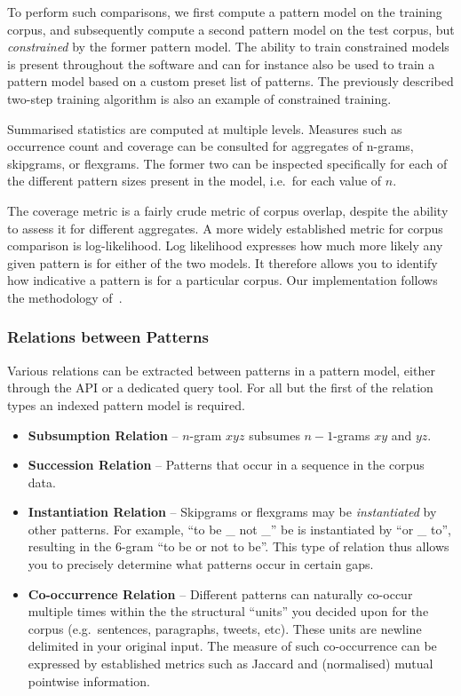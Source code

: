 \documentclass[a4paper,12pt]{article}
\begin{document}
To perform such comparisons, we first compute a pattern model on the training
corpus, and subsequently compute a second pattern model on the test corpus, but
\emph{constrained} by the former pattern model. The ability to train
constrained models is present throughout the software and can for instance also
be used to train a pattern model based on a custom preset list of patterns. The
previously described two-step training algorithm is also an example of
constrained training.

Summarised statistics are computed at multiple levels. Measures such as
occurrence count and coverage can be consulted for aggregates of n-grams,
skipgrams, or flexgrams. The former two can be inspected specifically for each
of the different pattern sizes present in the model, i.e.\ for each value of $n$.

The coverage metric is a fairly crude metric of corpus overlap, despite the
ability to assess it for different aggregates. A more widely established metric
for corpus comparison is log-likelihood. Log likelihood expresses how much more
likely any given pattern is for either of the two models. It therefore allows
you to identify how indicative a pattern is for a particular corpus. Our
implementation follows the methodology of~\cite{Rayson00comparingcorpora}.

\subsubsection{Relations between Patterns}

Various relations can be extracted between patterns in a pattern model, either
through the API or a dedicated query tool. For all but the first of the
relation types an indexed pattern model is required. 

\begin{itemize}
 \item \textbf{Subsumption Relation} -- $n$-gram $x y z$ subsumes $n-1$-grams $x y$ and $y z$. 
 \item \textbf{Succession Relation} -- Patterns that occur in a sequence in the corpus data. 
 \item \textbf{Instantiation Relation} -- Skipgrams or flexgrams may be
     \emph{instantiated} by other patterns. For example, ``to be \_ not \_'' be
     is instantiated by ``or \_ to'', resulting in the 6-gram ``to be or not to be''. This type of relation thus allows you to precisely determine what patterns occur in certain gaps.
 \item \textbf{Co-occurrence Relation} -- Different patterns can naturally co-occur multiple times
     within the the structural ``units'' you decided upon for the corpus (e.g.\ 
     sentences, paragraphs, tweets, etc). These units are newline delimited in
     your original input. The measure of such co-occurrence 
     can be expressed by established metrics such as Jaccard and (normalised) mutual
     pointwise information.
\end{itemize}
\end{document}
